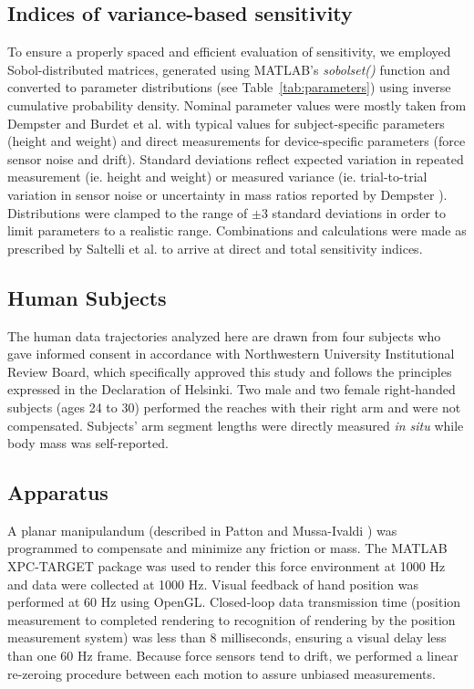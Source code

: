 \subsection*{Indices of variance-based sensitivity}
To ensure a properly spaced and efficient evaluation of sensitivity, we employed Sobol-distributed matrices, generated using MATLAB's \textit{sobolset()} function and converted to parameter distributions (see Table~\ref{tab:parameters}) using inverse cumulative probability density. Nominal parameter values were mostly taken from Dempster \cite{dempster1955space} and Burdet et al. \cite{burdet2006stability} with typical values for subject-specific parameters (height and weight) and direct measurements for device-specific parameters (force sensor noise and drift). Standard deviations reflect expected variation in repeated measurement (ie. height and weight) or measured variance (ie. trial-to-trial variation in sensor noise or uncertainty in mass ratios reported by Dempster \cite{dempster1955space}). Distributions were clamped to the range of $\pm3$ standard deviations in order to limit parameters to a realistic range. Combinations and calculations were made as prescribed by Saltelli et al. \cite{saltelli2010variance} to arrive at direct and total sensitivity indices.

\subsection*{Human Subjects}
The human data trajectories analyzed here are drawn from four subjects who gave informed consent in accordance with Northwestern University Institutional Review Board, which specifically approved this study and follows the principles expressed in the Declaration of Helsinki. Two male and two female right-handed subjects (ages 24 to 30) performed the reaches with their right arm and were not compensated. Subjects' arm segment lengths were directly measured \textit{in situ} while body mass was self-reported. 

\subsection*{Apparatus}
A planar manipulandum (described in Patton and Mussa-Ivaldi \cite{patton2004robot}) was programmed to compensate and minimize any friction or mass. The MATLAB XPC-TARGET package \cite{MATLAB:2008} was used to render this force environment at 1000 Hz and data were collected at 1000 Hz.  Visual feedback of hand position was performed at 60 Hz using OpenGL. Closed-loop data transmission time (position measurement to completed rendering to recognition of rendering by the position measurement system) was less than 8 milliseconds, ensuring a visual delay less than one 60 Hz frame. Because force sensors tend to drift, we performed a linear re-zeroing procedure between each motion to assure unbiased measurements. 

